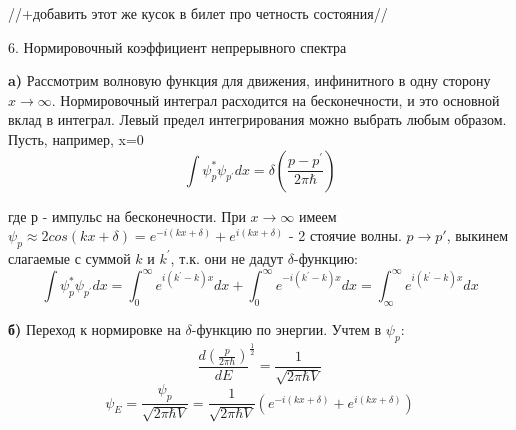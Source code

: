 //+добавить этот же кусок в билет про четность состояния//
\par 6\textdegree. Нормировочный коэффициент непрерывного спектра
\par \textbf{a)} Рассмотрим волновую функция для движения, инфинитного в одну сторону $x \rightarrow \infty $. Нормировочный интеграл расходится на бесконечности, и это основной вклад в интеграл. Левый предел интегрирования можно выбрать любым образом. Пусть, например, x=0
$$\int \psi^*_p \psi_{p^\prime}dx = \delta \left( \frac{p-p^\prime}{2\pi \hbar}\right)$$
\par где р - импульс на бесконечности. При $x \rightarrow \infty$ имеем $\psi_p \approx  2 cos(kx+\delta)= e^{-i(kx+\delta)}+e^{i(kx+\delta)}$ - 2 стоячие волны. $p \rightarrow p\prime$, выкинем слагаемые с суммой $k$ и $k^\prime$, т.к. они не дадут $\delta$-функцию:
$$\int \psi^*_p \psi_{p^\prime}dx = \int^{\infty}_0 e^{i(k^\prime-k)x} dx + \int^{\infty}_0 e^{-i(k^\prime-k)x} dx = \int^{\infty}_{\infty} e^{i(k^\prime-k)x} dx $$
\par \textbf{б)} Переход к нормировке на $\delta$-функцию по энергии. Учтем в $\psi_p$:
$$\frac{d \left(\frac{p}{2\pi\hbar} \right)}{dE}^{\frac{1}{2}} = \frac{1}{\sqrt{2\pi\hbar V}} $$
$$\psi_E= \frac{\psi_p}{\sqrt{2\pi\hbar V}} = \frac{1}{\sqrt{2\pi\hbar V}} \left(e^{-i(kx+\delta)}+e^{i(kx+\delta)} \right)$$